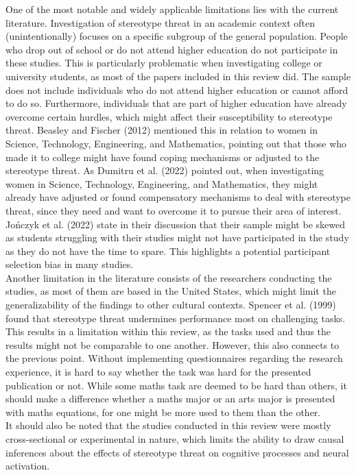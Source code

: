 \documentclass[
  stu, a4paper, 12pt,mask,floatsintext]{apa7}
\begin{document}
One of the most notable and widely applicable limitations lies with the current literature.
Investigation of stereotype threat in an academic context often (unintentionally) focuses on a specific subgroup of the general population.
People who drop out of school or do not attend higher education do not participate in these studies.
This is particularly problematic when investigating college or university students, as most of the papers included in this review did.
The sample does not include individuals who do not attend higher education or cannot afford to do so.
Furthermore, individuals that are part of higher education have already overcome certain hurdles, which might affect their susceptibility to stereotype threat.
Beasley and Fischer (2012) mentioned this in relation to women in Science, Technology, Engineering, and Mathematics, pointing out that those who made it to college might have found coping mechanisms or adjusted to the stereotype threat. As Dumitru et al. (2022) pointed out, when investigating women in Science, Technology, Engineering, and Mathematics, they might already have adjusted or found compensatory mechanisms to deal with stereotype threat, since they need and want to overcome it to pursue their area of interest.
Jończyk et al. (2022) state in their discussion that their sample might be skewed as students struggling with their studies might not have participated in the study as they do not have the time to spare.
This highlights a potential participant selection bias in many studies.\\
Another limitation in the literature consists of the researchers conducting the studies, as most of them are based in the United States, which might limit the generalizability of the findings to other cultural contexts.
Spencer et al. (1999) found that stereotype threat undermines performance most on challenging tasks.
This results in a limitation within this review, as the tasks used and thus the results might not be comparable to one another.
However, this also connects to the previous point.
Without implementing questionnaires regarding the research experience, it is hard to say whether the task was hard for the presented publication or not.
While some maths task are deemed to be hard than others, it should make a difference whether a maths major or an arts major is presented with maths equations, for one might be more used to them than the other.\\
It should also be noted that the studies conducted in this review were mostly cross-sectional or experimental in nature, which limits the ability to draw causal inferences about the effects of stereotype threat on cognitive processes and neural activation.
\end{document}
